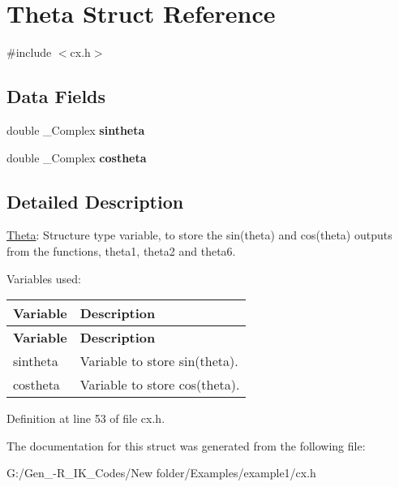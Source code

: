 \hypertarget{struct_theta}{}\section{Theta Struct Reference}
\label{struct_theta}


{\ttfamily \#include $<$cx.\+h$>$}

\subsection*{Data Fields}
\begin{DoxyCompactItemize}
\item 
\mbox{\label{struct_theta_a52d5fcaad2bc567dddde4c74c1a67919}} 
double \+\_\+\+Complex {\bfseries sintheta}
\item 
\mbox{\label{struct_theta_a9b9955bdf805e7dc574b6edf2277638f}} 
double \+\_\+\+Complex {\bfseries costheta}
\end{DoxyCompactItemize}


\subsection{Detailed Description}
\hyperlink{struct_theta}{Theta}\+: Structure type variable, to store the sin(theta) and cos(theta) outputs from the functions, \textquotesingle{}theta1\textquotesingle{}, \textquotesingle{}theta2\textquotesingle{} and \textquotesingle{}theta6\textquotesingle{}.

Variables used\+: \tabulinesep=1mm
\begin{longtabu} spread 0pt [c]{*{2}{|X[-1]}|}
\hline
\rowcolor{\tableheadbgcolor}\textbf{ Variable }&\textbf{ Description  }\\
\endfirsthead
\hline
\endfoot
\hline
\rowcolor{\tableheadbgcolor}\textbf{ Variable }&\textbf{ Description  }\\
\endhead
sintheta &Variable to store sin(theta). \\
costheta &Variable to store cos(theta). \\
\end{longtabu}


Definition at line 53 of file cx.\+h.



The documentation for this struct was generated from the following file\+:\begin{DoxyCompactItemize}
\item 
G\+:/\+Gen\+\_-\/\+R\+\_\+\+I\+K\+\_\+\+Codes/\+New folder/\+Examples/example1/cx.\+h\end{DoxyCompactItemize}
